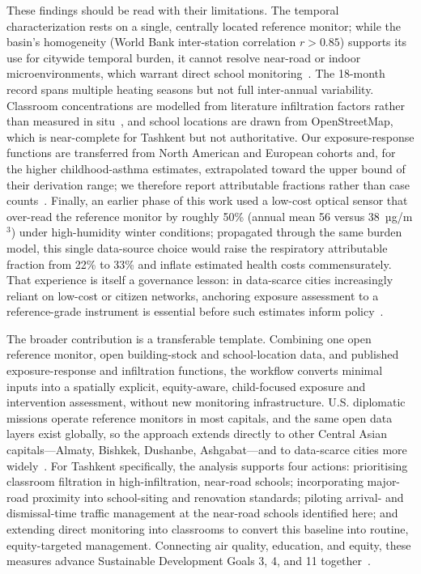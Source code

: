 \documentclass[11pt,a4paper]{article}
\begin{document}
These findings should be read with their limitations. The temporal characterization rests on a single, centrally located reference monitor; while the basin's homogeneity (World Bank inter-station correlation $r>0.85$) supports its use for citywide temporal burden, it cannot resolve near-road or indoor microenvironments, which warrant direct school monitoring~\cite{wilson2005spatial,jerrett2005spatial}. The 18-month record spans multiple heating seasons but not full inter-annual variability. Classroom concentrations are modelled from literature infiltration factors rather than measured in situ~\cite{abt2000relative,chen2012review,macintosh2009residential}, and school locations are drawn from OpenStreetMap, which is near-complete for Tashkent but not authoritative. Our exposure-response functions are transferred from North American and European cohorts and, for the higher childhood-asthma estimates, extrapolated toward the upper bound of their derivation range; we therefore report attributable fractions rather than case counts~\cite{burnett2014integrated,cohen2017estimates}. Finally, an earlier phase of this work used a low-cost optical sensor that over-read the reference monitor by roughly 50\% (annual mean 56 versus 38~µg/m$^3$) under high-humidity winter conditions; propagated through the same burden model, this single data-source choice would raise the respiratory attributable fraction from 22\% to 33\% and inflate estimated health costs commensurately. That experience is itself a governance lesson: in data-scarce cities increasingly reliant on low-cost or citizen networks, anchoring exposure assessment to a reference-grade instrument is essential before such estimates inform policy~\cite{morawska2019applications}.

The broader contribution is a transferable template. Combining one open reference monitor, open building-stock and school-location data, and published exposure-response and infiltration functions, the workflow converts minimal inputs into a spatially explicit, equity-aware, child-focused exposure and intervention assessment, without new monitoring infrastructure. U.S. diplomatic missions operate reference monitors in most capitals, and the same open data layers exist globally, so the approach extends directly to other Central Asian capitals---Almaty, Bishkek, Dushanbe, Ashgabat---and to data-scarce cities more widely~\cite{worldbank2024centralasia,tursumbayeva2023}. For Tashkent specifically, the analysis supports four actions: prioritising classroom filtration in high-infiltration, near-road schools; incorporating major-road proximity into school-siting and renovation standards; piloting arrival- and dismissal-time traffic management at the near-road schools identified here; and extending direct monitoring into classrooms to convert this baseline into routine, equity-targeted management. Connecting air quality, education, and equity, these measures advance Sustainable Development Goals 3, 4, and 11 together~\cite{nieuwenhuijsen2019influence,landrigan2017lancet}.
\end{document}
